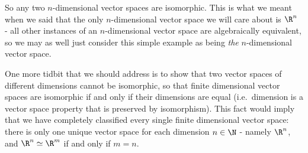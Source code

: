 So any two \( n \)-dimensional vector spaces are isomorphic. This is what we meant when we said that the only \( n \)-dimensional vector space we will care about is \( \R^n \) - all other instances of an \( n \)-dimensional vector space are algebraically equivalent, so we may as well just consider this simple example as being \emph{the} \( n \)-dimensional vector space.

\vspace{3mm}

One more tidbit that we should address is to show that two vector spaces of different dimensions cannot be isomorphic, so that finite dimensional vector spaces are isomorphic if and only if their dimensions are equal (i.e.\ dimension is a vector space property that is preserved by isomorphism). This fact would imply that we have completely classified every single finite dimensional vector space: there is only one unique vector space for each dimension \( n\in\N \) - namely \( \R^n \), and \( \R^n\simeq\R^m \) if and only if \( m=n \).

